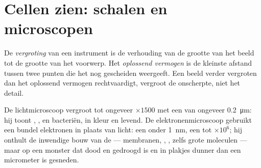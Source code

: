 \section{Cellen zien: schalen en microscopen}

\begin{definition}\label{def:g10:cells-common-unit:magnification}
De \emph{vergroting} van een instrument is de
verhouding van de grootte van het beeld tot de grootte van het voorwerp.
Het \emph{oplossend vermogen} is de kleinste
afstand tussen twee punten die het nog gescheiden weergeeft. Een beeld
verder vergroten dan het oplossend vermogen rechtvaardigt, vergroot de
onscherpte, niet het detail.
\end{definition}

\begin{proposition}\label{prop:g10:cells-common-unit:microscopes}
De lichtmicroscoop vergroot tot ongeveer $\times 1500$ met een  van ongeveer \qty{0.2}{\micro m}: hij toont , ,
 en bacteriën, in kleur en levend. De
elektronenmicroscoop gebruikt een bundel elektronen in plaats van licht:
een  onder \qty{1}{nm}, een  tot
$\times 10^6$; hij onthult de inwendige bouw van de  --- membranen,
, , zelfs grote moleculen --- maar op een monster
dat dood en gedroogd is en in plakjes dunner dan een micrometer is
gesneden.
\end{proposition}
\admitted

